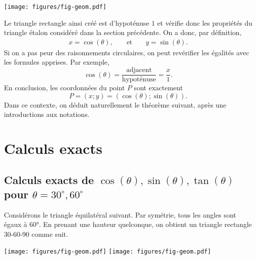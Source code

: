 	\begin{center}
	\texttt{[image: figures/fig-geom.pdf]}
	\end{center}

Le triangle rectangle ainsi créé est d'hypoténuse $1$ et vérifie donc les propriétés du triangle étalon considéré dans la section précédente.
On a donc, par définition,
	\begin{align*}
		x = \cos(\theta), && \text{ et } && y = \sin(\theta).
	\end{align*}
Si on a pas peur des raisonnements circulaires, on peut revérifier les égalités avec les formules apprises.
Par exemple,
	\[
		\cos(\theta) = \dfrac{\text{adjacent}}{\text{hypoténuse}} = \dfrac{x}{1}.
	\]
En conclusion, les coordonnées du point $P$ sont exactement
	\[ P = (x ; y) = \left( \cos(\theta) ; \sin(\theta) \right). \]
Dans ce contexte, on déduit naturellement le théorème suivant, après une introductions aux notations.






\section{Calculs exacts}

\subsection{Calculs exacts de $\cos(\theta), \sin(\theta), \tan(\theta)$ pour $\theta=30^\circ, 60^\circ$}

Considérons le triangle équilatéral suivant.
Par symétrie, tous les angles sont égaux à 60°.
En prenant une hauteur quelconque, on obtient un triangle rectangle 30-60-90 comme suit.

	\begin{center}
	\texttt{[image: figures/fig-geom.pdf]}
	\hspace{4cm}
	\texttt{[image: figures/fig-geom.pdf]}
	\end{center}

